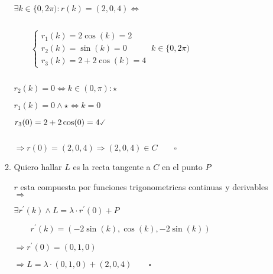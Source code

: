 \documentclass[../parcial.tex]{subfiles}
\begin{document}
\begin{enumerate}
\begin{enumerate}
                    $ $

                    $ \exists k \in \{0, 2\pi) : r(k) = (2,0,4) \Leftrightarrow $

                    $ $

                    $\qquad \left\{
                        \begin{array}{ll}
                            r_1(k) = 2\cos(k) = 2\\
                            r_2(k) = \sin(k) = 0\\
                            r_3(k) = 2 + 2\cos(k) = 4
                        \end{array}
                    \right.\ k \in \{0, 2\pi)$

                    $ $

                    $ r_2(k) = 0 \Leftrightarrow k \in (0, \pi) :\star $

                    $ r_1(k) = 0 \wedge \star \Leftrightarrow k = 0$

                    $ r_3(0) = 2 + 2\cos(0) = 4 \checked $

                    $ $

                    $ \Rightarrow r(0) = (2,0,4) \Rightarrow (2,0,4) \in C \qquad \square $

                \item Quiero hallar $ L $ es la recta tangente a $C$ en el punto $P$
                
                    $r$ esta compuesta por funciones trigonometricas continuas y derivables $\Rightarrow$

                    $ \exists r^\prime(k) \wedge L = \lambda \cdot r^\prime(0) + P $

                    $ \qquad r^\prime(k) = (-2\sin(k),\cos(k),-2\sin(k)) $

                    $ \Rightarrow r^\prime(0) = (0,1,0) $

                    $ \Rightarrow L = \lambda \cdot (0,1,0) + (2,0,4) \qquad \square$

            \end{enumerate}
    \end{enumerate}
\end{document}
